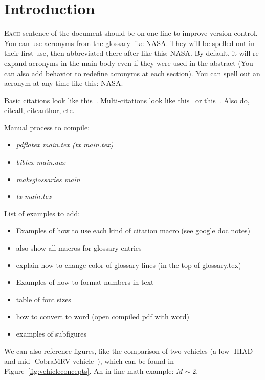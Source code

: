 \section{Introduction}\label{sec:intro}


\lettrine{E}{ach} sentence of the document should be on one line to improve version control.
You can use acronyms from the glossary like \gls{NASA}.
They will be spelled out in their first use, then abbreviated there after like this: \gls{NASA}.
By default, it will re-expand acronyms in the main body even if they were used in the abstract (You can also add behavior to redefine acronyms at each section).
You can spell out an acronym at any time like this: \acrfull{NASA}.

Basic citations look like this~\cite{halstrom2021aerodynamic}.
Multi-citations look like this~\cite{halstrom2022overflow,halstrom2021investigation} or this~\cite{halstrom2022overflow,halstrom2021investigation,halstrom2021aerodynamic}.
Also do, citeall, citeauthor, etc.



Manual process to compile:
\begin{itemize}
  \item \textit{pdflatex main.tex (tx main.tex)}
  \item \textit{bibtex main.aux}
  \item \textit{makeglossaries main}
  \item \textit{tx main.tex}
\end{itemize}


\noindent List of examples to add:
\begin{itemize}
  \item Examples of how to use each kind of citation macro (see google doc notes) %
  \item also show all macros for glossary entries
  \item explain how to change color of glossary lines (in the top of glossary.tex)
  \item Examples of how to format numbers in text
  \item table of font sizes
  \item how to convert to word (open compiled pdf with word)
  \item examples of subfigures
\end{itemize}

We can also reference figures, like the comparison of two vehicles (a low- \gls{HIAD}~\cite{halstrom2022overflow} and mid- CobraMRV vehicle~\cite{halstrom2022overflow,halstrom2021investigation,halstrom2021aerodynamic}), which can be found in Figure~\ref{fig:vehicleconcepts}.
An in-line math example: \(M \sim 2\).

